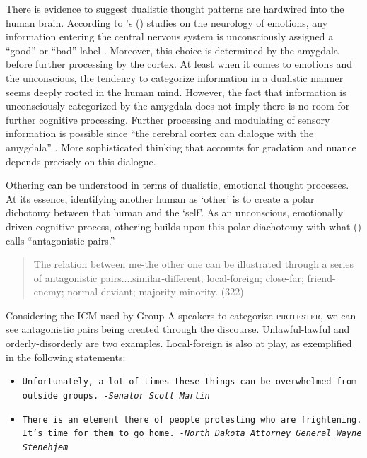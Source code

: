 There is evidence to suggest dualistic thought patterns are hardwired into the human brain. According to \citeauthor{LeDoux1994}'s (\citeyear{LeDoux1994}) studies on the neurology of emotions, any information entering the central nervous system is unconsciously assigned a ``good'' or ``bad'' label \citep[31]{Wood2005}. Moreover, this choice is determined by the amygdala before further processing by the cortex.  At least when it comes to emotions and the unconscious, the tendency to categorize information in a dualistic manner seems deeply rooted in the human mind. However, the fact that information is unconsciously categorized by the amygdala does not imply there is no room for further cognitive processing. Further processing and modulating of sensory information is possible since ``the cerebral cortex can dialogue with the amygdala'' \citep[32]{Wood2005}. More sophisticated thinking that accounts for gradation and nuance depends precisely on this dialogue.   

Othering can be understood in terms of dualistic, emotional thought processes. At its essence, identifying another human as `other' is to create a polar dichotomy between that human and the `self'. As an unconscious, emotionally driven cognitive process, othering builds upon this polar diachotomy with what \citeauthor{Fedor2014a} (\citeyear{Fedor2014a}) calls ``antagonistic pairs.''        

\begin{quote}
The relation between me-the other one can be illustrated through a series of antagonistic pairs....similar-different; local-foreign; close-far; friend-enemy; normal-deviant; majority-minority. (322)   
\end{quote}

Considering the ICM used by Group A speakers to categorize \textsc{protester}, we can see antagonistic pairs being created through the discourse. Unlawful-lawful and orderly-disorderly are two examples. Local-foreign is also at play, as exemplified in the following statements:

\begin{footnotesize}
\begin{itemize}
\item[] \texttt{Unfortunately, a lot of times these things can be overwhelmed from outside groups.\newline 
\textit{-Senator Scott Martin}}
\newline
\item[] \texttt{There is an element there of people protesting who are frightening. It's time for them to go home. \newline 
\textit{-North Dakota Attorney General Wayne Stenehjem}}
\end{itemize}
\end{footnotesize} 

